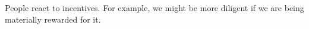 People react to incentives.
For example, we might be more diligent if we are being materially rewarded for it.